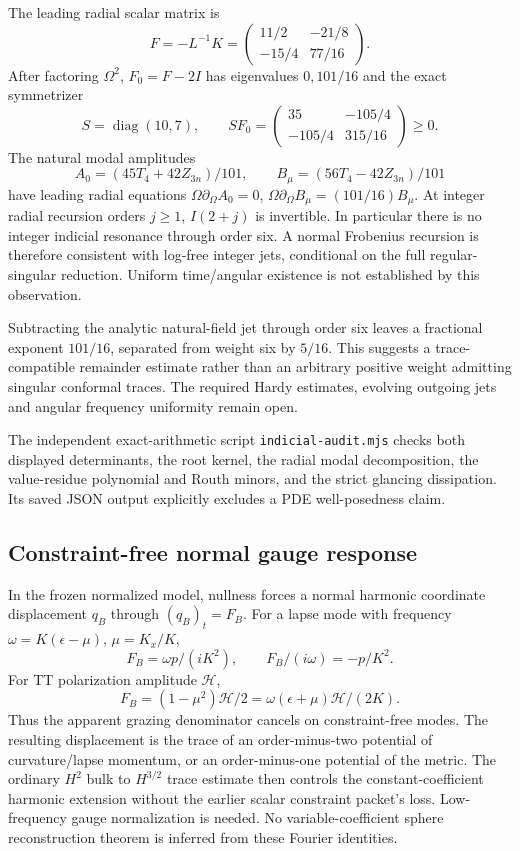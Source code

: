 \documentclass[11pt]{article}
\begin{document}
The leading radial scalar matrix is
\[
F=-L^{-1}K=
\begin{pmatrix}11/2&-21/8\\-15/4&77/16\end{pmatrix}.
\]
After factoring $\Omega^2$, $F_0=F-2I$ has eigenvalues
$0,101/16$ and the exact symmetrizer
\[
S=\operatorname{diag}(10,7),\qquad
SF_0=\begin{pmatrix}35&-105/4\\-105/4&315/16\end{pmatrix}\geq0 .
\]
The natural modal amplitudes
\[
A_0=(45T_4+42Z_{3n})/101,\qquad
B_\mu=(56T_4-42Z_{3n})/101
\]
have leading radial equations
$\Omega\partial_\Omega A_0=0$,
$\Omega\partial_\Omega B_\mu=(101/16)B_\mu$.
At integer radial recursion orders $j\geq1$,
$I(2+j)$ is invertible. In particular there is no integer indicial
resonance through order six. A normal Frobenius recursion is therefore
consistent with log-free integer jets, conditional on the full
regular-singular reduction. Uniform time/angular existence is not
established by this observation.

Subtracting the analytic natural-field jet through order six leaves a
fractional exponent $101/16$, separated from weight six by $5/16$.
This suggests a trace-compatible remainder estimate rather than an
arbitrary positive weight admitting singular conformal traces.
The required Hardy estimates, evolving outgoing jets and angular
frequency uniformity remain open.

The independent exact-arithmetic script \texttt{indicial-audit.mjs}
checks both displayed determinants, the root kernel, the radial modal
decomposition, the value-residue polynomial and Routh minors, and the
strict glancing dissipation. Its saved JSON output explicitly excludes
a PDE well-posedness claim.

\subsection{Constraint-free normal gauge response}
In the frozen normalized model, nullness forces a normal harmonic
coordinate displacement $q_B$ through $(q_B)_t=F_B$.
For a lapse mode with frequency
$\omega=K(\epsilon-\mu)$, $\mu=K_x/K$,
\[
F_B=\omega p/(iK^2),\qquad F_B/(i\omega)=-p/K^2.
\]
For TT polarization amplitude $\mathcal H$,
\[
F_B=(1-\mu^2)\mathcal H/2
=\omega(\epsilon+\mu)\mathcal H/(2K).
\]
Thus the apparent grazing denominator cancels on constraint-free modes.
The resulting displacement is the trace of an order-minus-two potential
of curvature/lapse momentum, or an order-minus-one potential of the
metric. The ordinary $H^2$ bulk to $H^{3/2}$ trace estimate then controls
the constant-coefficient harmonic extension without the earlier scalar
constraint packet's loss. Low-frequency gauge normalization is needed.
No variable-coefficient sphere reconstruction theorem is inferred from
these Fourier identities.
\end{document}
